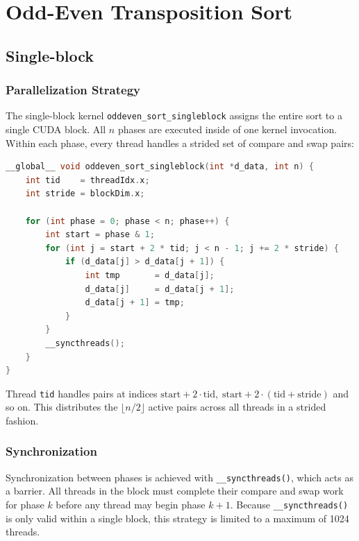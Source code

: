 \documentclass[11pt,a4paper]{article}
\begin{document}
\section{Odd-Even Transposition Sort}

\subsection{Single-block}

\subsubsection{Parallelization Strategy}

The single-block kernel \texttt{oddeven\_sort\_singleblock} assigns the entire sort to a single CUDA block. All $n$ phases are executed inside of one kernel invocation. Within each phase, every thread handles a strided set of compare and swap pairs:

\begin{lstlisting}[language=C++, caption={Single-block kernel}]
__global__ void oddeven_sort_singleblock(int *d_data, int n) {
    int tid    = threadIdx.x;
    int stride = blockDim.x;

    for (int phase = 0; phase < n; phase++) {
        int start = phase & 1;
        for (int j = start + 2 * tid; j < n - 1; j += 2 * stride) {
            if (d_data[j] > d_data[j + 1]) {
                int tmp       = d_data[j];
                d_data[j]     = d_data[j + 1];
                d_data[j + 1] = tmp;
            }
        }
        __syncthreads();
    }
}
\end{lstlisting}

Thread \texttt{tid} handles pairs at indices $\text{start} + 2\cdot\text{tid},\;
\text{start} + 2\cdot(\text{tid}+\text{stride})$ and so on. This distributes the $\lfloor n/2 \rfloor$ active pairs across all threads in a strided fashion.

\subsubsection{Synchronization}

Synchronization between phases is achieved with \texttt{\_\_syncthreads()}, which acts as a barrier. All threads in the block must complete their compare and swap work for phase $k$ before any thread may begin phase $k+1$. Because \texttt{\_\_syncthreads()} is only valid within a single block, this strategy is limited to a maximum of 1024 threads.
\end{document}
